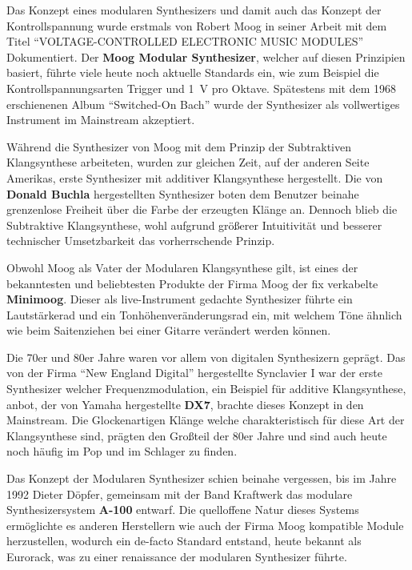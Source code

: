 Das Konzept eines modularen Synthesizers und damit auch das Konzept der Kontrollspannung wurde erstmals von Robert Moog in seiner Arbeit mit dem Titel "`VOLTAGE-CONTROLLED ELECTRONIC MUSIC MODULES"' Dokumentiert. \cite{moog1964} Der \textbf{Moog Modular Synthesizer}, welcher auf diesen Prinzipien basiert, führte viele heute noch aktuelle Standards ein, wie zum Beispiel die Kontrollspannungsarten Trigger und \SI{1}{\volt} pro Oktave. Spätestens mit dem 1968 erschienenen Album "`Switched-On Bach"' wurde der Synthesizer als vollwertiges Instrument im Mainstream akzeptiert.

Während die Synthesizer von Moog mit dem Prinzip der Subtraktiven Klangsynthese arbeiteten, wurden zur gleichen Zeit, auf der anderen Seite Amerikas, erste Synthesizer mit additiver Klangsynthese hergestellt. Die von \textbf{Donald Buchla} hergestellten Synthesizer boten dem Benutzer beinahe grenzenlose Freiheit über die Farbe der erzeugten Klänge an. Dennoch blieb die Subtraktive Klangsynthese, wohl aufgrund größerer Intuitivität und besserer technischer Umsetzbarkeit das vorherrschende Prinzip.

Obwohl Moog als Vater der Modularen Klangsynthese gilt, ist eines der bekanntesten und beliebtesten Produkte der Firma Moog der fix verkabelte \textbf{Minimoog}. Dieser als live-Instrument gedachte Synthesizer führte ein Lautstärkerad und ein Tonhöhenveränderungsrad ein, mit welchem Töne ähnlich wie beim Saitenziehen bei einer Gitarre verändert werden können.

Die 70er und 80er Jahre waren vor allem von digitalen Synthesizern geprägt. Das von der Firma "`New England Digital"' hergestellte Synclavier I war der erste Synthesizer welcher Frequenzmodulation, ein Beispiel für additive Klangsynthese, anbot, der von Yamaha hergestellte \textbf{DX7}, brachte dieses Konzept in den Mainstream. Die Glockenartigen Klänge welche charakteristisch für diese Art der Klangsynthese sind, prägten den Großteil der 80er Jahre und sind auch heute noch häufig im Pop und im Schlager zu finden.

Das Konzept der Modularen Synthesizer schien beinahe vergessen, bis im Jahre 1992 Dieter Döpfer, gemeinsam mit der Band Kraftwerk das modulare Synthesizersystem \textbf{A-100} entwarf. Die quelloffene Natur dieses Systems ermöglichte es anderen Herstellern wie auch der Firma Moog kompatible Module herzustellen, wodurch ein de-facto Standard entstand, heute bekannt als Eurorack, was zu einer renaissance der modularen Synthesizer führte.

